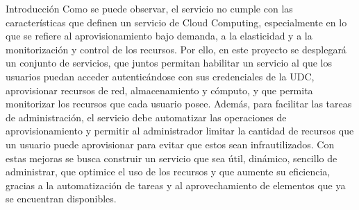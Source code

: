 \begin{chapter}{Introducción}
Como se puede observar, el servicio no cumple con las características que definen un servicio de Cloud Computing, especialmente en lo que se refiere al aprovisionamiento bajo demanda, a la elasticidad y a la monitorización y control de los recursos. Por ello, en este proyecto se desplegará un conjunto de servicios, que juntos permitan habilitar un servicio al que los usuarios puedan acceder autenticándose con sus credenciales de la UDC, aprovisionar recursos de red, almacenamiento y cómputo, y que permita monitorizar los recursos que cada usuario posee. Además, para facilitar las tareas de administración, el servicio debe automatizar las operaciones de aprovisionamiento y permitir al administrador limitar la cantidad de recursos que un usuario puede aprovisionar para evitar que estos sean infrautilizados.
Con estas mejoras se busca construir un servicio que sea útil, dinámico, sencillo de administrar, que optimice el uso de los recursos y que aumente su eficiencia, gracias a la automatización de tareas y al aprovechamiento de elementos que ya se encuentran disponibles.





\end{chapter}
